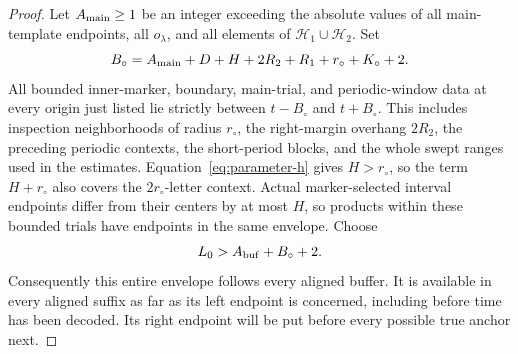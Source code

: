 \begin{proof}
Let \(A_{\rm main}\ge1\) be an integer exceeding the absolute values
of all main-template endpoints, all \(o_\lambda\), and all elements
of \(\mathcal H_1\cup\mathcal H_2\).  Set
\begin{equation}\label{eq:parameter-inner-envelope}
 B_\circ=A_{\rm main}+D+H+2R_2+R_1+r_\circ+K_\circ+2.
\end{equation}
All bounded inner-marker, boundary, main-trial, and periodic-window
data at every origin just listed lie strictly between
\(t-B_\circ\) and \(t+B_\circ\).  This includes inspection
neighborhoods of radius \(r_\circ\), the right-margin overhang
\(2R_2\), the preceding periodic contexts, the short-period blocks,
and the whole swept ranges used in the estimates.
Equation~\eqref{eq:parameter-h} gives \(H>r_\circ\), so the term
\(H+r_\circ\) also covers the \(2r_\circ\)-letter context.
Actual marker-selected interval endpoints differ from their centers by at
most \(H\), so products within these bounded trials have endpoints
in the same envelope.  Choose
\begin{equation}\label{eq:parameter-l0}
 L_0>A_{\rm buf}+B_\circ+2.
\end{equation}
Consequently this entire envelope follows every aligned buffer.  It
is available in every aligned suffix as far as its left endpoint is
concerned, including before time has been decoded.  Its right
endpoint will be put before every possible true anchor next.


\end{proof}
